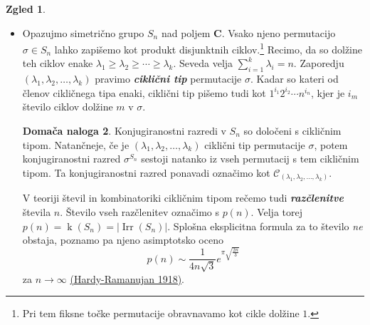 \documentclass[11pt]{book}
\def\CC{\mathbf{C}}
\def\conclass{\mathcal{C}}
\DeclareMathOperator\Irr{Irr}
\DeclareMathOperator\kk{k}
\def\definicija{\color{rdeca}\bf\em}
\theoremstyle{definition}
\theoremstyle{zgled}
\newtheorem*{zgled}{Zgled}
\theoremstyle{odprtproblem}
\theoremstyle{domacanaloga}
\newtheorem*{domacanaloga}{Domača naloga}
\theoremstyle{izrek}
\begin{document}
\begin{zgled}
\begin{itemize}
Skupaj smo torej našli ravno $\kk(D_{2n})$ nerazcepnih upodobitev, zato so to \emph{vse} nerazcepne upodobitve grupe $D_{2n}$.

\begin{table}[t]
    \centering
\begin{tabular}{c|ccc}
    & $1$ & $r^i$ & $s$ \\ \hline
    $\chi_{\epsilon}$ & $1$ & $1$ & $\epsilon$ \\
    $\chi_{\rho_k}$ & $2$ & $2 \cos(2 \pi i k / n)$ & $0$ \\
\end{tabular}
\caption{Tabela karakterjev $D_{2n}$ za lih $n$}
\end{table}

\begin{domacanaloga}
Izračunaj tabelo kompleksnih karakterjev kvaternionske grupe $Q_8 = \{ \pm 1, \pm i, \pm j, \pm k \}$, v kateri velja $i^2 = j^2 = k^2 = ijk = -1$. Primerjaj jo s tabelo karakterjev grupe $D_8$.
\end{domacanaloga}

\item Opazujmo simetrično grupo $S_n$ nad poljem $\CC$. Vsako njeno permutacijo $\sigma \in S_n$ lahko zapišemo kot produkt disjunktnih ciklov.\footnote{Pri tem fiksne točke permutacije obravnavamo kot cikle dolžine $1$.} Recimo, da so dolžine teh ciklov enake $\lambda_1 \geq \lambda_2 \geq \cdots \geq \lambda_{k}$. Seveda velja $\sum_{i = 1}^{k} \lambda_i = n$. Zaporedju $(\lambda_1, \lambda_2, \dots, \lambda_{k})$ pravimo {\definicija ciklični tip} permutacije $\sigma$. Kadar so kateri od členov cikličnega tipa enaki, ciklični tip pišemo tudi kot $1^{i_1} 2^{i_2} \cdots n^{i_n}$, kjer je $i_m$ število ciklov dolžine $m$ v $\sigma$.

\begin{domacanaloga}
Konjugiranostni razredi v $S_n$ so določeni s cikličnim tipom. Natančneje, če je $(\lambda_1, \lambda_2, \dots, \lambda_{k})$ ciklični tip permutacije $\sigma$, potem konjugiranostni razred $\sigma^{S_n}$ sestoji natanko iz vseh permutacij s tem cikličnim tipom. Ta konjugiranostni razred ponavadi označimo kot $\conclass_{(\lambda_1, \lambda_2, \dots, \lambda_k)}$.
\end{domacanaloga}

V teoriji števil in kombinatoriki cikličnim tipom rečemo tudi {\definicija razčlenitve} števila $n$. Število vseh razčlenitev označimo s $p(n)$. Velja torej $p(n) = \kk(S_n) = |\Irr(S_n)|$. Splošna eksplicitna formula za to število \emph{ne} obstaja, poznamo pa njeno asimptotsko oceno
\[
    p(n) \sim \frac{1}{4 n \sqrt{3}} e^{\pi \sqrt{\frac{2n}{3}}}
\]
za $n \to \infty$ \href{https://academic.oup.com/plms/article-abstract/s2-17/1/75/1536632?redirectedFrom=PDF}{(Hardy-Ramanujan 1918)}. 


\end{itemize}
\end{zgled}
\end{document}
